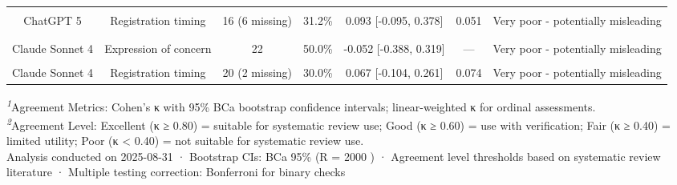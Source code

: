 \begin{table}[t]
\begin{tabular*}{\linewidth}{@{\extracolsep{\fill}}ccccccc}
{\cellcolor[HTML]{F7F7F7}{ChatGPT 5}} & {\cellcolor[HTML]{F7F7F7}{Team integrity}} & {\cellcolor[HTML]{F7F7F7}{22}} & {\cellcolor[HTML]{F7F7F7}{54.5\%}} & {\cellcolor[HTML]{F7F7F7}{0.200 [-0.143, 0.518]}} & {\cellcolor[HTML]{F7F7F7}{0.227}} & {\cellcolor[HTML]{F7F7F7}{Poor - not suitable for systematic review use}} \\ 
ChatGPT 5 & Registration timing & 16 (6 missing) & 31.2\% & 0.093 [-0.095, 0.378] & 0.051 & Very poor - potentially misleading \\ 
\midrule\addlinespace[2.5pt]
\multicolumn{7}{l}{{\bfseries \cellcolor[HTML]{2E86AB}{\textcolor[HTML]{FFFFFF}{Claude Sonnet 4}}}} \\[2.5pt] 
\midrule\addlinespace[2.5pt]
{\cellcolor[HTML]{F7F7F7}{Claude Sonnet 4}} & {\cellcolor[HTML]{F7F7F7}{Retraction}} & {\cellcolor[HTML]{F7F7F7}{22}} & {\cellcolor[HTML]{F7F7F7}{90.9\%}} & {\cellcolor[HTML]{F7F7F7}{0.621 [0.000, 1.000]}} & {\cellcolor[HTML]{F7F7F7}{—}} & {\cellcolor[HTML]{F7F7F7}{Good - suitable with verification}} \\ 
Claude Sonnet 4 & Expression of concern & 22 & 50.0\% & -0.052 [-0.388, 0.319] & — & Very poor - potentially misleading \\ 
{\cellcolor[HTML]{F7F7F7}{Claude Sonnet 4}} & {\cellcolor[HTML]{F7F7F7}{Team integrity}} & {\cellcolor[HTML]{F7F7F7}{22}} & {\cellcolor[HTML]{F7F7F7}{50.0\%}} & {\cellcolor[HTML]{F7F7F7}{0.000 [-0.432, 0.374]}} & {\cellcolor[HTML]{F7F7F7}{0.000}} & {\cellcolor[HTML]{F7F7F7}{Very poor - potentially misleading}} \\ 
Claude Sonnet 4 & Registration timing & 20 (2 missing) & 30.0\% & 0.067 [-0.104, 0.261] & 0.074 & Very poor - potentially misleading \\ 
\bottomrule
\end{tabular*}
\begin{minipage}{\linewidth}
\textsuperscript{\textit{1}}Agreement Metrics: Cohen's κ with 95\% BCa bootstrap confidence intervals; linear-weighted κ for ordinal assessments.\\
\textsuperscript{\textit{2}}Agreement Level: Excellent (κ ≥ 0.80) = suitable for systematic review use; Good (κ ≥ 0.60) = use with verification; Fair (κ ≥ 0.40) = limited utility; Poor (κ < 0.40) = not suitable for systematic review use.\\
Analysis conducted on 2025-08-31 · Bootstrap CIs: BCa 95\% (R = 2000 ) · Agreement level thresholds based on systematic review literature · Multiple testing correction: Bonferroni for binary checks\\
\end{minipage}
\end{table}

